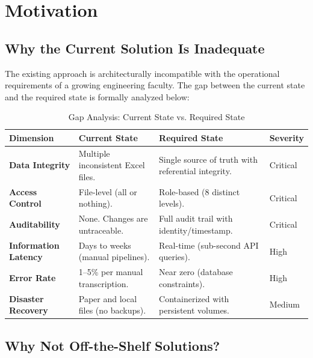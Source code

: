 \section{Motivation}
\label{sec:motivation}

\subsection{Why the Current Solution Is Inadequate}

The existing approach is architecturally incompatible with the operational requirements of a growing engineering faculty. The gap between the current state and the required state is formally analyzed below:

\begin{table}[H]
    \centering
    \renewcommand{\arraystretch}{1.3}
    \begin{tabular}{|p{}|p{}|p{}|p{}|}
        \hline
        \textbf{Dimension} & \textbf{Current State} & \textbf{Required State} & \textbf{Severity} \\
        \hline
        \textbf{Data Integrity} & Multiple inconsistent Excel files. & Single source of truth with referential integrity. & Critical \\
        \hline
        \textbf{Access Control} & File-level (all or nothing). & Role-based (8 distinct levels). & Critical \\
        \hline
        \textbf{Auditability} & None. Changes are untraceable. & Full audit trail with identity/timestamp. & Critical \\
        \hline
        \textbf{Information Latency} & Days to weeks (manual pipelines). & Real-time (sub-second API queries). & High \\
        \hline
        \textbf{Error Rate} & 1--5\% per manual transcription. & Near zero (database constraints). & High \\
        \hline
        \textbf{Disaster Recovery} & Paper and local files (no backups). & Containerized with persistent volumes. & Medium \\
        \hline
    \end{tabular}
    \caption{Gap Analysis: Current State vs. Required State}
    \label{tab:gap_analysis}
\end{table}

\subsection{Why Not Off-the-Shelf Solutions?}


